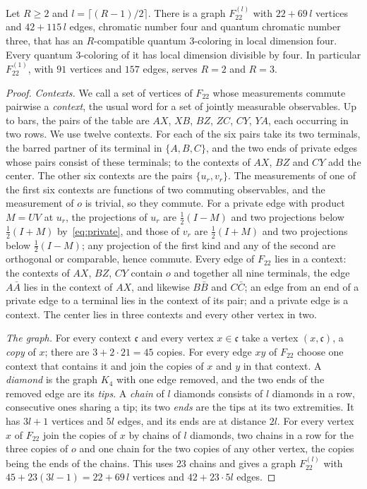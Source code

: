 \begin{proposition}[Stretching $F_{22}$]\label{prop:stretch}
Let $R\ge2$ and $l=\lceil(R-1)/2\rceil$. There is a graph $F_{22}^{(l)}$ with $22+69\,l$ vertices and $42+115\,l$ edges, chromatic number four and quantum chromatic number three, that has an $R$-compatible quantum $3$-coloring in local dimension four. Every quantum $3$-coloring of it has local dimension divisible by four. In particular $F_{22}^{(1)}$, with $91$ vertices and $157$ edges, serves $R=2$ and $R=3$.
\end{proposition}
\begin{proof}
\emph{Contexts.} We call a set of vertices of $F_{22}$ whose measurements commute pairwise a \emph{context}, the usual word for a set of jointly measurable observables. Up to bars, the pairs of the table are $AX$, $XB$, $BZ$, $ZC$, $CY$, $YA$, each occurring in two rows. We use twelve contexts. For each of the six pairs take its two terminals, the barred partner of its terminal in $\{A,B,C\}$, and the two ends of private edges whose pairs consist of these terminals; to the contexts of $AX$, $BZ$ and $CY$ add the center. The other six contexts are the pairs $\{u_r,v_r\}$. The measurements of one of the first six contexts are functions of two commuting observables, and the measurement of $o$ is trivial, so they commute. For a private edge with product $M=UV$ at $u_r$, the projections of $u_r$ are $\frac12(I-M)$ and two projections below $\frac12(I+M)$ by~\eqref{eq:private}, and those of $v_r$ are $\frac12(I+M)$ and two projections below $\frac12(I-M)$; any projection of the first kind and any of the second are orthogonal or comparable, hence commute. Every edge of $F_{22}$ lies in a context: the contexts of $AX$, $BZ$, $CY$ contain $o$ and together all nine terminals, the edge $A\bar A$ lies in the context of $AX$, and likewise $B\bar B$ and $C\bar C$; an edge from an end of a private edge to a terminal lies in the context of its pair; and a private edge is a context. The center lies in three contexts and every other vertex in two.

\emph{The graph.} For every context $\mathfrak c$ and every vertex $x\in\mathfrak c$ take a vertex $(x,\mathfrak c)$, a \emph{copy} of $x$; there are $3+2\cdot21=45$ copies. For every edge $xy$ of $F_{22}$ choose one context that contains it and join the copies of $x$ and $y$ in that context. A \emph{diamond} is the graph $K_4$ with one edge removed, and the two ends of the removed edge are its \emph{tips}. A \emph{chain} of $l$ diamonds consists of $l$ diamonds in a row, consecutive ones sharing a tip; its two \emph{ends} are the tips at its two extremities. It has $3l+1$ vertices and $5l$ edges, and its ends are at distance $2l$. For every vertex $x$ of $F_{22}$ join the copies of $x$ by chains of $l$ diamonds, two chains in a row for the three copies of $o$ and one chain for the two copies of any other vertex, the copies being the ends of the chains. This uses $23$ chains and gives a graph $F_{22}^{(l)}$ with $45+23(3l-1)=22+69\,l$ vertices and $42+23\cdot5l$ edges.


\end{proof}
